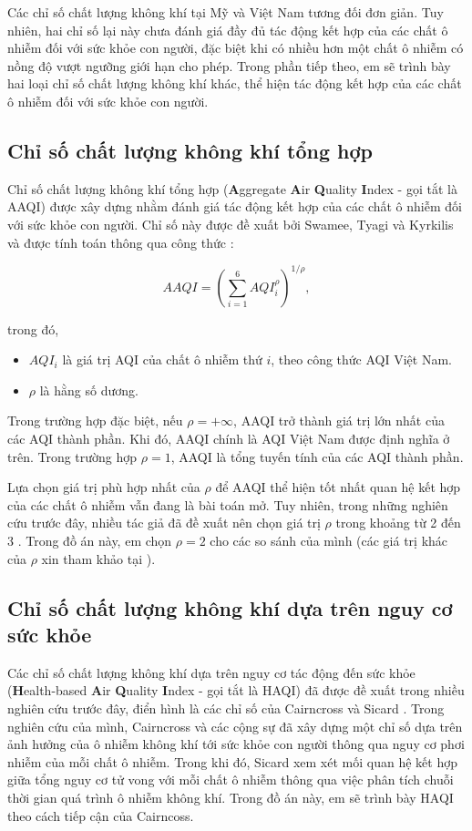 \documentclass[14pt]{extreport}
\theoremstyle{definition}
\theoremstyle{plain}
\theoremstyle{remark}
\begin{document}
Các chỉ số chất lượng không khí tại Mỹ và Việt Nam tương đối đơn giản. Tuy nhiên, hai chỉ số lại này chưa đánh giá đầy đủ tác động kết hợp của các chất ô nhiễm đối với sức khỏe con người, đặc biệt khi có nhiều hơn một chất ô nhiễm có nồng độ vượt ngưỡng giới hạn cho phép. Trong phần tiếp theo, em sẽ trình bày hai loại chỉ số chất lượng không khí khác, thể hiện tác động kết hợp của các chất ô nhiễm đối với sức khỏe con người.

\subsection{Chỉ số chất lượng không khí tổng hợp}
Chỉ số chất lượng không khí tổng hợp (\textbf{A}ggregate \textbf{A}ir \textbf{Q}uality \textbf{I}ndex - gọi tắt là AAQI) được xây dựng nhằm đánh giá tác động kết hợp của các chất ô nhiễm đối với sức khỏe con người. Chỉ số này được đề xuất bởi Swamee, Tyagi và Kyrkilis và được tính toán thông qua công thức \cite{Swamee1999, Kyrkilis2007}:

\begin{equation}
AAQI = {\left( \sum_{i = 1}^6 AQI_i^{\rho} \right)}^{1/\rho},
\end{equation}
{trong đó,  \begin{itemize}
\item $AQI_i$ là giá trị AQI của chất ô nhiễm thứ $i$, theo công thức AQI Việt Nam.
\item $\rho$ là hằng số dương.
\end{itemize} }

Trong trường hợp đặc biệt, nếu $\rho = +\infty$, AAQI trở thành giá trị lớn nhất của các AQI thành phần. Khi đó, AAQI chính là AQI Việt Nam được định nghĩa ở trên. Trong trường hợp $\rho=1$, AAQI là tổng tuyến tính của các AQI thành phần. 

Lựa chọn giá trị phù hợp nhất của $\rho$ để AAQI thể hiện tốt nhất quan hệ kết hợp của các chất ô nhiễm vẫn đang là bài toán mở. Tuy nhiên, trong những nghiên cứu trước đây, nhiều tác giả đã đề xuất nên chọn giá trị $\rho$ trong khoảng từ 2 đến 3 \cite{Khanna2000, Swamee1999}. Trong đồ án này, em chọn $\rho=2$ cho các so sánh của mình (các giá trị khác của $\rho$ xin tham khảo tại \cite{Jianlin2015}).

\subsection{Chỉ số chất lượng không khí dựa trên nguy cơ sức khỏe}
Các chỉ số chất lượng không khí dựa trên nguy cơ tác động đến sức khỏe (\textbf{H}ealth-based \textbf{A}ir \textbf{Q}uality \textbf{I}ndex - gọi tắt là HAQI) đã được đề xuất trong nhiều nghiên cứu trước đây, điển hình là các chỉ số của Cairncross và Sicard \cite{Cairncross2007, Sicard2012}. Trong nghiên cứu của mình, Cairncross và các cộng sự đã xây dựng một chỉ số dựa trên ảnh hưởng của ô nhiễm không khí tới sức khỏe con người thông qua nguy cơ phơi nhiễm của mỗi chất ô nhiễm. Trong khi đó, Sicard xem xét mối quan hệ kết hợp giữa tổng nguy cơ tử vong với mỗi chất ô nhiễm thông qua việc phân tích chuỗi thời gian quá trình ô nhiễm không khí. Trong đồ án này, em sẽ trình bày HAQI theo cách tiếp cận của Cairncoss\cite{Cairncross2007}.
\end{document}
